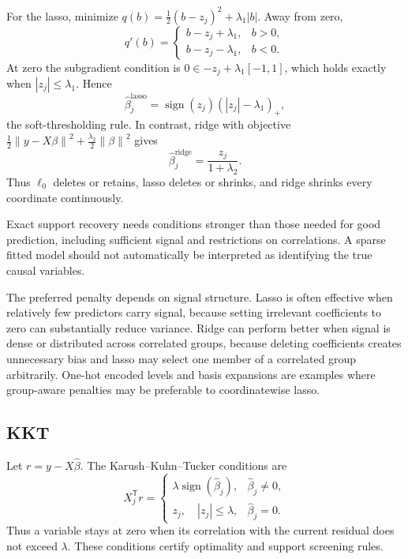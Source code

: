 \documentclass[12pt,oneside]{book}
\numberwithin{equation}{section}
\theoremstyle{definition}
\theoremstyle{plain}
\theoremstyle{remark}
\newcommand{\norm}[1]{\left\lVert #1 \right\rVert}
\newcommand{\abs}[1]{\left\lvert #1 \right\rvert}
\begin{document}
For the lasso, minimize
$q(b)=\tfrac12(b-z_j)^2+\lambda_1|b|$. Away from zero,
\[
 q'(b)=
 \begin{cases}
  b-z_j+\lambda_1,&b>0,\\
  b-z_j-\lambda_1,&b<0.
 \end{cases}
\]
At zero the subgradient condition is
$0\in-z_j+\lambda_1[-1,1]$, which holds exactly when
$|z_j|\leq\lambda_1$. Hence
\begin{equation}
 \widehat\beta_j^{\mathrm{lasso}}
 =\operatorname{sign}(z_j)(|z_j|-\lambda_1)_+,
 \label{eq:orthonormal-soft-threshold}
\end{equation}
the soft-thresholding rule. In contrast, ridge with objective
$\tfrac12\norm{y-X\beta}^2+\tfrac{\lambda_2}{2}\norm\beta^2$ gives
\begin{equation}
 \widehat\beta_j^{\mathrm{ridge}}=\frac{z_j}{1+\lambda_2}.
 \label{eq:orthonormal-ridge}
\end{equation}
Thus $\ell_0$ deletes or retains, lasso deletes or shrinks, and ridge shrinks
every coordinate continuously.

Exact support recovery needs conditions stronger than those needed for good
prediction, including sufficient signal and restrictions on correlations.
A sparse fitted model should not automatically be interpreted as identifying
the true causal variables.

The preferred penalty depends on signal structure. Lasso is often effective
when relatively few predictors carry signal, because setting irrelevant
coefficients to zero can substantially reduce variance. Ridge can perform
better when signal is dense or distributed across correlated groups, because
deleting coefficients creates unnecessary bias and lasso may select one
member of a correlated group arbitrarily. One-hot encoded levels and basis
expansions are examples where group-aware penalties may be preferable to
coordinatewise lasso.

\subsection{KKT}

Let $r=y-X\widehat\beta$. The Karush--Kuhn--Tucker conditions are
\begin{equation}
 X_j^\mathsf Tr=
 \begin{cases}
   \lambda\operatorname{sign}(\widehat\beta_j),
      &\widehat\beta_j\neq0,\\
   z_j,\quad\abs{z_j}\leq\lambda,
      &\widehat\beta_j=0.
 \end{cases}
 \label{eq:lasso-kkt}
\end{equation}
Thus a variable stays at zero when its correlation with the current residual
does not exceed $\lambda$. These conditions certify optimality and support
screening rules.
\end{document}
